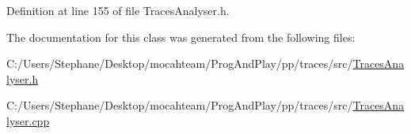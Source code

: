 Definition at line 155 of file Traces\+Analyser.\+h.



The documentation for this class was generated from the following files\+:\begin{DoxyCompactItemize}
\item 
C\+:/\+Users/\+Stephane/\+Desktop/mocahteam/\+Prog\+And\+Play/pp/traces/src/\hyperlink{_traces_analyser_8h}{Traces\+Analyser.\+h}\item 
C\+:/\+Users/\+Stephane/\+Desktop/mocahteam/\+Prog\+And\+Play/pp/traces/src/\hyperlink{_traces_analyser_8cpp}{Traces\+Analyser.\+cpp}\end{DoxyCompactItemize}
